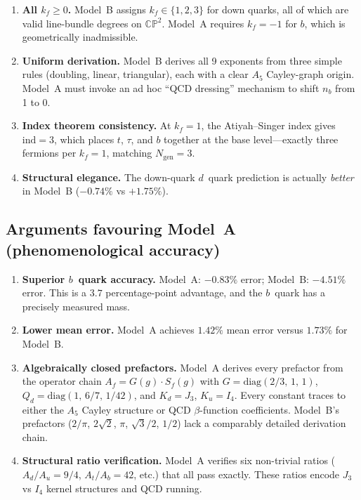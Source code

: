 \documentclass[11pt]{article}
\begin{document}
\begin{enumerate}
  \item \textbf{All $k_f \geq 0$.}  Model~B assigns $k_f \in \{1,2,3\}$
    for down quarks, all of which are valid line-bundle degrees on
    $\mathbb{CP}^2$.  Model~A requires $k_f = -1$ for $b$, which is
    geometrically inadmissible.

  \item \textbf{Uniform derivation.}  Model~B derives all 9 exponents from
    three simple rules (doubling, linear, triangular), each with a clear
    $A_5$ Cayley-graph origin.  Model~A must invoke an ad hoc ``QCD
    dressing'' mechanism to shift $n_b$ from 1 to 0.

  \item \textbf{Index theorem consistency.}  At $k_f=1$, the Atiyah--Singer
    index gives $\mathrm{ind} = 3$, which places $t$, $\tau$, and $b$
    together at the base level---exactly three fermions per $k_f=1$, matching
    $N_{\text{gen}}=3$.

  \item \textbf{Structural elegance.}  The down-quark $d$~quark prediction
    is actually \emph{better} in Model~B ($-0.74\%$ vs $+1.75\%$).
\end{enumerate}

\subsection{Arguments favouring Model~A (phenomenological accuracy)}

\begin{enumerate}
  \item \textbf{Superior $b$~quark accuracy.}  Model~A: $-0.83\%$ error;
    Model~B: $-4.51\%$ error.  This is a $3.7$ percentage-point advantage,
    and the $b$~quark has a precisely measured mass.

  \item \textbf{Lower mean error.}  Model~A achieves $1.42\%$ mean error
    versus $1.73\%$ for Model~B.

  \item \textbf{Algebraically closed prefactors.}  Model~A derives every
    prefactor from the operator chain $A_f = G(g)\cdot S_f(g)$ with
    $G = \mathrm{diag}(2/3,\,1,\,1)$, $Q_d = \mathrm{diag}(1,\,6/7,\,
    1/42)$, and $K_d = J_3$, $K_u = I_4$.  Every constant traces to either
    the $A_5$ Cayley structure or QCD $\beta$-function coefficients.  Model~B's
    prefactors ($2/\pi$, $2\sqrt{2}$, $\pi$, $\sqrt{3}/2$, $1/2$) lack a
    comparably detailed derivation chain.

  \item \textbf{Structural ratio verification.}  Model~A verifies six
    non-trivial ratios ($A_d/A_u = 9/4$, $A_t/A_b = 42$, etc.) that all
    pass exactly.  These ratios encode $J_3$ vs $I_4$ kernel structures and
    QCD running.
\end{enumerate}
\end{document}
